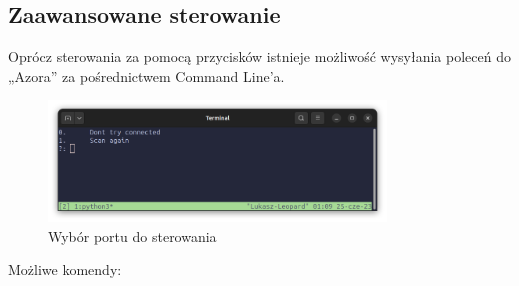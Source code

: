     \subsection{Zaawansowane sterowanie}
        \tab Oprócz sterowania za pomocą przycisków istnieje możliwość wysyłania poleceń do „Azora” za pośrednictwem Command Line'a.\\
        \begin{figure}[!h]
            \centering
            \includegraphics[width = 0.8\textwidth]{Img/CLI.png}
            \caption{Wybór portu do sterowania}
        \end{figure}
        Możliwe komendy:
